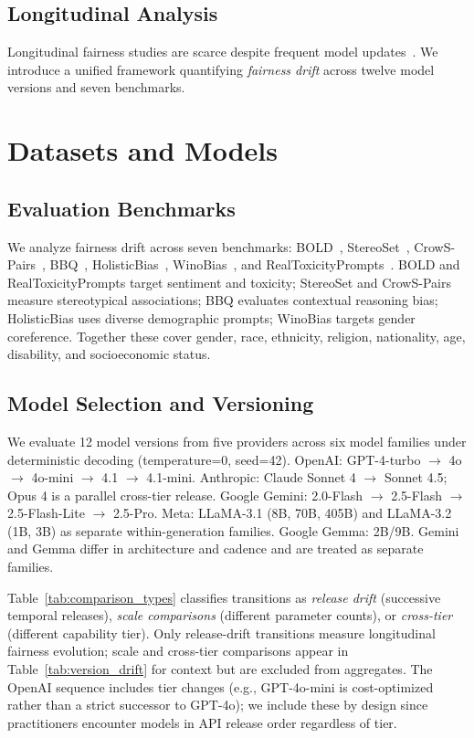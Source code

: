 \documentclass[11pt]{article}
\begin{document}
\subsection{Longitudinal Analysis}
Longitudinal fairness studies are scarce despite frequent model updates~\citep{mehrabi2021survey,garg2024identity}. We introduce a unified framework quantifying \emph{fairness drift} across twelve model versions and seven benchmarks.

\section{Datasets and Models}

\subsection{Evaluation Benchmarks}
We analyze fairness drift across seven benchmarks: BOLD~\citep{dhamala2021bold}, StereoSet~\citep{nadeem2021stereoset}, CrowS-Pairs~\citep{nangia2020crows}, BBQ~\citep{parrish2022bbq}, HolisticBias~\citep{smith2022holisticbias}, WinoBias~\citep{zhao2018winobias}, and RealToxicityPrompts~\citep{gehman2020realtoxicity}. BOLD and RealToxicityPrompts target sentiment and toxicity; StereoSet and CrowS-Pairs measure stereotypical associations; BBQ evaluates contextual reasoning bias; HolisticBias uses diverse demographic prompts; WinoBias targets gender coreference. Together these cover gender, race, ethnicity, religion, nationality, age, disability, and socioeconomic status.

\subsection{Model Selection and Versioning}
\label{sec:models}
We evaluate 12 model versions from five providers across six model families under deterministic decoding (temperature=0, seed=42). OpenAI: GPT-4-turbo $\rightarrow$ 4o $\rightarrow$ 4o-mini $\rightarrow$ 4.1 $\rightarrow$ 4.1-mini. Anthropic: Claude Sonnet 4 $\rightarrow$ Sonnet 4.5; Opus 4 is a parallel cross-tier release. Google Gemini: 2.0-Flash $\rightarrow$ 2.5-Flash $\rightarrow$ 2.5-Flash-Lite $\rightarrow$ 2.5-Pro. Meta: LLaMA-3.1 (8B, 70B, 405B) and LLaMA-3.2 (1B, 3B) as separate within-generation families. Google Gemma: 2B/9B. Gemini and Gemma differ in architecture and cadence and are treated as separate families.

Table~\ref{tab:comparison_types} classifies transitions as \emph{release drift} (successive temporal releases), \emph{scale comparisons} (different parameter counts), or \emph{cross-tier} (different capability tier). Only release-drift transitions measure longitudinal fairness evolution; scale and cross-tier comparisons appear in Table~\ref{tab:version_drift} for context but are excluded from aggregates. The OpenAI sequence includes tier changes (e.g., GPT-4o-mini is cost-optimized rather than a strict successor to GPT-4o); we include these by design since practitioners encounter models in API release order regardless of tier.
\end{document}
